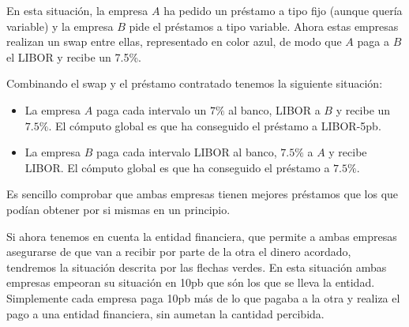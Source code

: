 \begin{problem}[3]
\begin{center}
\begin{tikzpicture}
\end{tikzpicture}
\end{center}

En esta situación, la empresa $A$ ha pedido un préstamo a tipo fijo (aunque quería variable) y la empresa $B$ pide el préstamos a tipo variable.
Ahora estas empresas realizan un swap entre ellas, representado en color azul, de modo que $A$ paga a $B$ el LIBOR y recibe un 7.5\%.

Combinando el swap y el préstamo contratado tenemos la siguiente situación:
\begin{itemize}
\item La empresa $A$ paga cada intervalo un $7\%$ al banco, LIBOR a $B$ y recibe un $7.5\%$. El cómputo global es que ha conseguido el préstamo a LIBOR-5pb.
\item La empresa $B$ paga cada intervalo LIBOR al banco, $7.5\%$ a $A$ y recibe LIBOR. El cómputo global es que ha conseguido el préstamo a $7.5\%$.
\end{itemize}

Es sencillo comprobar que ambas empresas tienen mejores préstamos que los que podían obtener por si mismas en un principio.

Si ahora tenemos en cuenta la entidad financiera, que permite a ambas empresas asegurarse de que van a recibir por parte de la otra
el dinero acordado, tendremos la situación descrita por las flechas verdes. En esta situación ambas empresas empeoran su situación en 10pb que són los que se
lleva la entidad. Simplemente cada empresa paga 10pb más de lo que pagaba a la otra y realiza el pago a una entidad financiera, sin aumetan la cantidad
percibida.
\end{problem}


